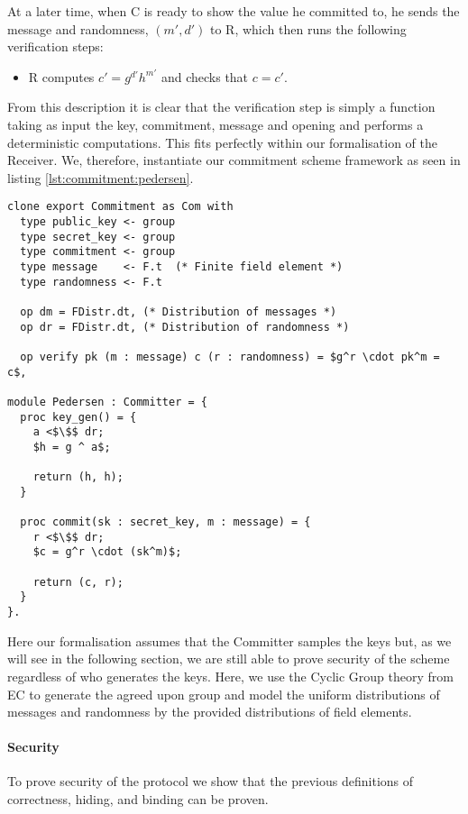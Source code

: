 At a later time, when C is ready to show the value he committed to, he sends the
message and randomness, $(m',d')$ to R, which then runs the following
verification steps:
\begin{itemize}
  \item R computes $c' = g^{d'}h^{m'}$ and checks that $c = c'$.
\end{itemize}

From this description it is clear that the verification step is simply a
function taking as input the key, commitment, message and opening and performs a
deterministic computations. This fits perfectly within our formalisation of the
Receiver. We, therefore, instantiate our commitment scheme framework as seen in
listing \ref{lst:commitment:pedersen}.

\begin{lstlisting}[mathescape,label=lst:commitment:pedersen,caption=Pedersen instantiation,float]
clone export Commitment as Com with
  type public_key <- group
  type secret_key <- group
  type commitment <- group
  type message    <- F.t  (* Finite field element *)
  type randomness <- F.t

  op dm = FDistr.dt, (* Distribution of messages *)
  op dr = FDistr.dt, (* Distribution of randomness *)

  op verify pk (m : message) c (r : randomness) = $g^r \cdot pk^m = c$,

module Pedersen : Committer = {
  proc key_gen() = {
    a <$\$$ dr;
    $h = g ^ a$;

    return (h, h);
  }

  proc commit(sk : secret_key, m : message) = {
    r <$\$$ dr;
    $c = g^r \cdot (sk^m)$;

    return (c, r);
  }
}.

\end{lstlisting}

Here our formalisation assumes that the Committer samples the keys but, as we
will see in the following section, we are still able to prove security of the
scheme regardless of who generates the keys.
Here, we use the Cyclic Group theory from EC to generate the agreed upon group
and model the uniform distributions of messages and randomness by the provided
distributions of field elements.

\paragraph{Security}
To prove security of the protocol we show that the previous definitions of
correctness, hiding, and binding can be proven.

